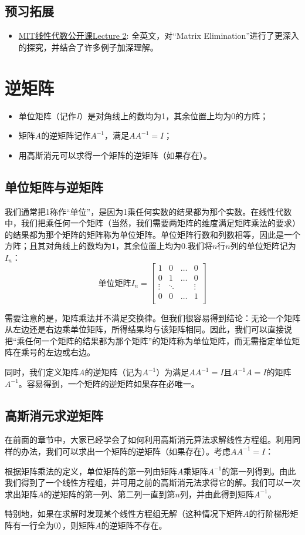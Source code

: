\documentclass{ctexart}
\begin{document}
\subsection{预习拓展}
\begin{itemize}
    \item \href{https://ocw.mit.edu/courses/mathematics/18-06-linear-algebra-spring-2010/video-lectures/lecture-2-elimination-with-matrices/}{MIT线性代数公开课Lecture 2}: 全英文，对“Matrix Elimination”进行了更深入的探究，并结合了许多例子加深理解。
\end{itemize}

\section{逆矩阵}
\begin{itemize}
    \item 单位矩阵（记作\textit{I}）是对角线上的数均为1，其余位置上均为0的方阵；
    \item 矩阵\textit{A}的逆矩阵记作$A^{-1}$，满足$AA^{-1}=I$；
    \item 用高斯消元可以求得一个矩阵的逆矩阵（如果存在）。
\end{itemize}
\subsection{单位矩阵与逆矩阵}
我们通常把1称作“单位”，是因为1乘任何实数的结果都为那个实数。在线性代数中，我们把乘任何一个矩阵（当然，我们需要两矩阵的维度满足矩阵乘法的要求）的结果都为那个矩阵的矩阵称为单位矩阵。单位矩阵行数和列数相等，因此是一个方阵；且其对角线上的数均为1，其余位置上均为0.我们将$n$行$n$列的单位矩阵记为$I_n$：
\[单位矩阵I_n=\begin{bmatrix}
1 & 0 & \dots & 0\\
0 & 1 & \dots & 0\\
\vdots & \ddots & &  \vdots\\
0 & 0 & \dots & 1\\
\end{bmatrix}\]
\par
需要注意的是，矩阵乘法并不满足交换律。但我们很容易得到结论：无论一个矩阵从左边还是右边乘单位矩阵，所得结果均与该矩阵相同。因此，我们可以直接说把“乘任何一个矩阵的结果都为那个矩阵”的矩阵称为单位矩阵，而无需指定单位矩阵在乘号的左边或右边。
\newline
\par
同时，我们定义矩阵\textit{A}的逆矩阵（记为$A^{-1}$）为满足$AA^{-1}=I$且$A^{-1}A=I$的矩阵$A^{-1}$。容易得到，一个矩阵的逆矩阵如果存在必唯一。
\subsection{高斯消元求逆矩阵}
在前面的章节中，大家已经学会了如何利用高斯消元算法求解线性方程组。利用同样的办法，我们可以求出一个矩阵的逆矩阵（如果存在）。考虑$AA^{-1}=I$：
\par
根据矩阵乘法的定义，单位矩阵的第一列由矩阵\textit{A}乘矩阵$A^{-1}$的第一列得到。由此我们得到了一个线性方程组，并可用之前的高斯消元法求得它的解。我们可以一次求出矩阵$A$的逆矩阵的第一列、第二列一直到第$n$列，并由此得到矩阵$A^{-1}$。
\par
特别地，如果在求解时发现某个线性方程组无解（这种情况下矩阵$A$的行阶梯形矩阵有一行全为0），则矩阵$A$的逆矩阵不存在。
\end{document}
